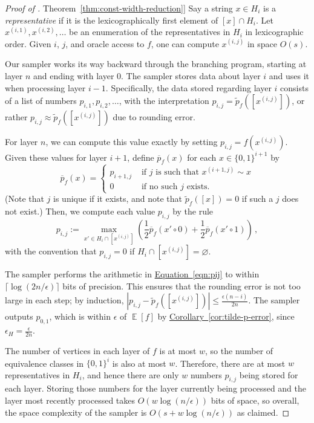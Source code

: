 \documentclass[11pt]{article}
\numberwithin{equation}{section}
\theoremstyle{definition}
\theoremstyle{plain}
\newcommand{\expref}[2]{\hyperref[#2]{#1~\ref{#2}}}
\newcommand{\expeqref}[2]{\hyperref[#2]{#1~\eqref{#2}}}
\DeclareMathOperator*{\ExpVal}{\mathbb{E}}
\begin{document}
\begin{proof}[Proof of \expref{Theorem}{thm:const-width-reduction}]
Say a string $x \in H_i$ is a \emph{representative} if it is the lexicographically first element of $[x] \cap H_i$. Let $x^{(i, 1)}, x^{(i, 2)}, \dots$ be an enumeration of the representatives in $H_i$ in lexicographic order. Given $i$, $j$, and oracle access to $f$, one can compute $x^{(i, j)}$ in space $O(s)$.

Our sampler works its way backward through the branching program, starting at layer $n$ and ending with layer $0$. The sampler stores data about layer $i$ and uses it when processing layer $i - 1$. Specifically, the data stored regarding layer $i$ consists of a list of numbers $p_{i, 1}, p_{i, 2}, \dots$, with the interpretation $p_{i, j} = \widetilde{p}_f([x^{(i, j)}])$, or rather $p_{i, j} \approx \widetilde{p}_f([x^{(i, j)}])$ due to rounding error.

For layer $n$, we can compute this value exactly by setting $p_{i, j} = f(x^{(i, j)})$. 
Given these values for layer $i + 1$, define $\overline{p}_f(x)$ for each $x \in \{0, 1\}^{i + 1}$ by
\[
\overline{p}_f(x) = \begin{cases}
p_{i + 1, j} & \text{ if $j$ is such that $x^{(i + 1, j)} \sim x$} \\
0 & \text{ if no such $j$ exists.}
\end{cases}
\]
(Note that $j$ is unique if it exists, and note that $\widetilde{p}_f([x]) = 0$ if such a $j$ does not exist.) Then, we compute each value $p_{i, j}$ by the rule
\begin{equation} \label{eqn:pij}
p_{i, j} := \max_{x' \in H_i \cap [x^{(i, j)}]} \left(\frac{1}{2} \overline{p}_f(x' \circ 0) + \frac{1}{2} \overline{p}_f(x' \circ 1)\right)\,,
\end{equation}
with the convention that $p_{i, j} = 0$ if $H_i \cap [x^{(i, j)}] = \varnothing$.

The sampler performs the arithmetic in \expeqref{Equation}{eqn:pij} to within $\lceil \log(2n/\epsilon)\rceil$ bits of precision. This ensures that the rounding error is not too large in each step; by induction, $|p_{i, j} - \widetilde{p}_f([x^{(i, j)}])| \leq \frac{\epsilon (n - i)}{2n}$. The sampler outputs $p_{0, 1}$, which is within $\epsilon$ of $\ExpVal[f]$ by \expref{Corollary}{cor:tilde-p-error}, since $\epsilon_H = \frac{\epsilon}{2n}$.

The number of vertices in each layer of $f$ is at most $w$, so the number of equivalence classes in $\{0, 1\}^i$ is also at most $w$. Therefore, there are at most $w$ representatives in $H_i$, and hence there are only $w$ numbers $p_{i, j}$ being stored for each layer. Storing those numbers for the layer currently being processed and the layer most recently processed takes $O(w \log(n/\epsilon))$ bits of space, so overall, the space complexity of the sampler is $O(s + w \log(n/\epsilon))$ as claimed.
\end{proof}
\end{document}
